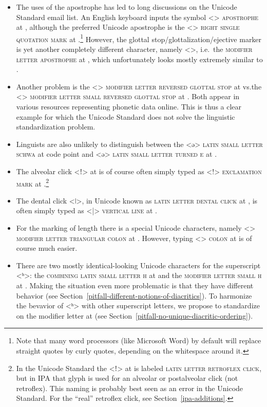 \begin{itemize}

   \item The uses of the apostrophe has led to long discussions on the Unicode
        Standard email list. An English keyboard inputs the symbol
        <> \textsc{apostrophe} at , although the preferred Unicode
        apostrophe is the <> \textsc{right single quotation mark} at
        .\footnote{Note that many word processors (like Microsoft
        Word) by default will replace straight quotes by curly quotes,
        depending on the whitespace around it.} However, the glottal
        stop/glottalization/ejective marker is yet another completely different
        character, namely <>, i.e.~the \textsc{modifier letter apostrophe} 
        at , which unfortunately looks mostly extremely similar to
        . 
  \item Another problem is the <> \textsc{modifier letter reversed glottal
        stop} at  vs.\@ the <> \textsc{modifier letter small reversed
        glottal stop} at . Both appear in various resources
        representing phonetic data online. This is thus a clear example for
        which the Unicode Standard does not solve the linguistic standardization
        problem.
  \item Linguists are also unlikely to distinguish between the <ə>
        \textsc{latin small letter schwa} at code point  and <ǝ>
        \textsc{latin small letter turned e} at .
  \item The alveolar click <ǃ> at  is of course often simply
        typed as <!> \textsc{exclamation mark} at .\footnote{In the
        Unicode Standard the <ǃ> at  is labeled \textsc{latin letter
        retroflex click}, but in IPA that glyph is used for an alveolar or
        postalveolar click (not retroflex). This naming is probably best seen as
        an error in the Unicode Standard. For the ``real'' retroflex click, see 
        Section~\ref{ipa-additions}.}
  \item The dental click <ǀ>, in Unicode known as \textsc{latin letter dental
        click} at , is often simply typed as <|> \textsc{vertical
        line} at .
  \item For the marking of length there is a special Unicode characters, namely
        <> \textsc{modifier letter triangular colon} at . However,
        typing <> \textsc{colon} at  is of course much easier.        
  \item There are two mostly identical-looking Unicode characters for the superscript
        <ʰ>: the \textsc{combining latin small letter h} at  and the
        \textsc{modifier letter small h} at . Making the situation 
        even more problematic is that they have different behavior (see 
        Section~\ref{pitfall-different-notions-of-diacritics}). To harmonize the 
        bevavior of <ʰ> with other superscript letters, we propose to 
        standardize on the modifier letter at  (see 
        Section~\ref{pitfall-no-unique-diacritic-ordering}).
  

\end{itemize}
